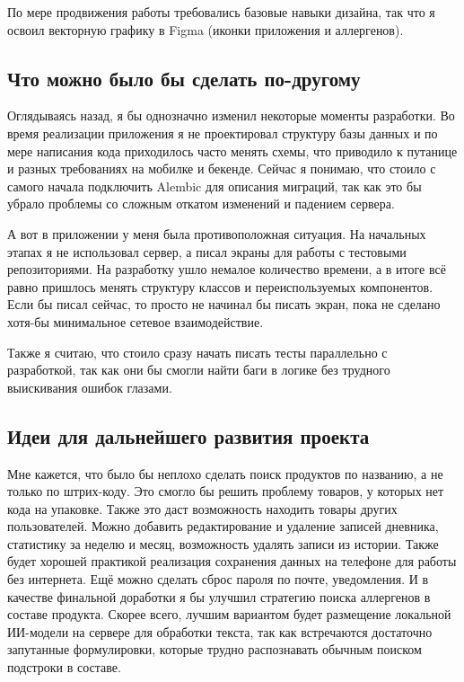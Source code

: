 \documentclass[14pt,a4paper]{extarticle}
\begin{document}
По мере продвижения работы требовались базовые навыки дизайна, так что я освоил векторную графику в Figma (иконки приложения и аллергенов).

\subsection{Что можно было бы сделать по-другому}
Оглядываясь назад, я бы однозначно изменил некоторые моменты разработки. Во время реализации приложения я не проектировал структуру базы данных и по мере написания кода приходилось часто менять схемы, что приводило к путанице и разных требованиях на мобилке и бекенде. Сейчас я понимаю, что стоило с самого начала подключить Alembic для описания миграций, так как это бы убрало проблемы со сложным откатом изменений и падением сервера.

А вот в приложении у меня была противоположная ситуация. На начальных этапах я не использовал сервер, а писал экраны для работы с тестовыми репозиториями. На разработку ушло немалое количество времени, а в итоге всё равно пришлось менять структуру классов и переиспользуемых компонентов. Если бы писал сейчас, то просто не начинал бы писать экран, пока не сделано хотя-бы минимальное сетевое взаимодействие.

Также я считаю, что стоило сразу начать писать тесты параллельно с разработкой, так как они бы смогли найти баги в логике без трудного выискивания ошибок глазами.

\subsection{Идеи для дальнейшего развития проекта}

Мне кажется, что было бы неплохо сделать поиск продуктов по названию, а не только по штрих-коду. Это смогло бы решить проблему товаров, у которых нет кода на упаковке. Также это даст возможность находить товары других пользователей. Можно добавить редактирование и удаление записей дневника, статистику за неделю и месяц, возможность удалять записи из истории. Также будет хорошей практикой реализация сохранения данных на телефоне для работы без интернета. Ещё можно сделать сброс пароля по почте, уведомления.
И в качестве финальной доработки я бы улучшил стратегию поиска аллергенов в составе продукта. Скорее всего, лучшим вариантом будет размещение локальной ИИ-модели на сервере для обработки текста, так как встречаются достаточно запутанные формулировки, которые трудно распознавать обычным поиском подстроки в составе.
\end{document}
